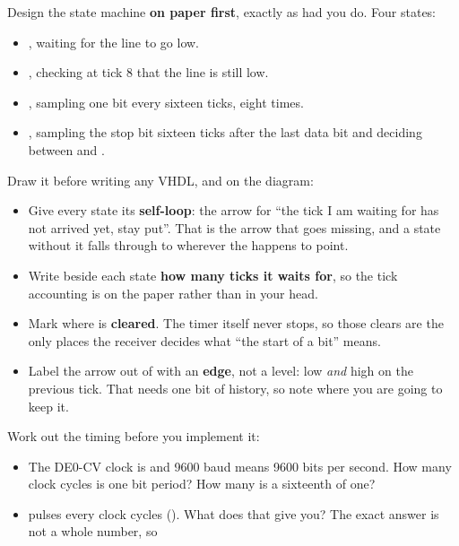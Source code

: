 \begin{parts}
  \item Design the state machine \textbf{on paper first}, exactly as  had you do.
    Four states:
    \begin{itemize}
      \item {}, waiting for the line to go low.
      \item {}, checking at tick 8 that the line is still low.
      \item {}, sampling one bit every sixteen ticks, eight times.
      \item {}, sampling the stop bit sixteen ticks after the last data bit and
        deciding between  and .
    \end{itemize}
    Draw it before writing any VHDL, and on the diagram:
    \begin{itemize}
      \item Give every state its \textbf{self-loop}: the arrow for ``the tick I am waiting for has
        not arrived yet, stay put''. That is the arrow that goes missing, and a state without it
        falls through to wherever the  happens to point.
      \item Write beside each state \textbf{how many ticks it waits for}, so the tick accounting is
        on the paper rather than in your head.
      \item Mark where  is \textbf{cleared}. The timer itself never stops, so those
        clears are the only places the receiver decides what ``the start of a bit'' means.
      \item Label the arrow out of  with an \textbf{edge}, not a level:
         low \emph{and} high on the previous tick. That needs one bit of history, so
        note where you are going to keep it.
    \end{itemize}
  \item Work out the timing before you implement it:
    \begin{itemize}
      \item The DE0-CV clock is  and 9600 baud means 9600 bits per second. How many
        clock cycles is one bit period? How many is a sixteenth of one?
      \item {} pulses every  clock cycles (). What
         does that give you? The exact answer is not a whole number, so

\end{itemize}
\end{parts}
